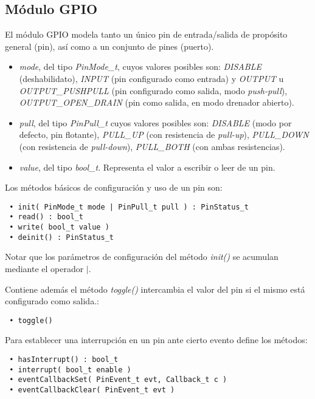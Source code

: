 \subsection{Módulo GPIO}

El módulo GPIO modela tanto un único pin de entrada/salida de propósito general (pin), así como a un conjunto de pines (puerto). 


\begin{itemize}
\item
\emph{mode}, del tipo \emph{PinMode\_t}, cuyos valores posibles son: \emph{DISABLE} (deshabilidato), \emph{INPUT} (pin configurado como entrada) y \emph{OUTPUT} u \emph{OUTPUT\_PUSHPULL} (pin configurado como salida, modo \emph{push-pull}), \emph{OUTPUT\_OPEN\_DRAIN} (pin como salida, en modo drenador abierto).
\item
\emph{pull}, del tipo \emph{PinPull\_t} cuyos valores posibles son: \emph{DISABLE} (modo por defecto, pin flotante), \emph{PULL\_UP} (con resistencia de \emph{pull-up}), \emph{PULL\_DOWN} (con resistencia de \emph{pull-down}), \emph{PULL\_BOTH} (con ambas resistencias).
\item
\emph{value}, del tipo \emph{bool\_t}. Representa el valor a escribir o leer de un pin.
\end{itemize}


Los métodos básicos de configuración y uso de un pin son:

\begin{verbatim}
 • init( PinMode_t mode | PinPull_t pull ) : PinStatus_t
 • read() : bool_t
 • write( bool_t value )
 • deinit() : PinStatus_t
\end{verbatim}

Notar que los parámetros de configuración del método \emph{init()} se acumulan mediante el operador $|$. 

Contiene además el método \emph{toggle()} intercambia el valor del pin si el mismo está configurado como salida.:

\begin{verbatim}
 • toggle()
\end{verbatim}

Para establecer una interrupción en un pin ante cierto evento define los métodos: 

\begin{verbatim}
 • hasInterrupt() : bool_t
 • interrupt( bool_t enable )
 • eventCallbackSet( PinEvent_t evt, Callback_t c )
 • eventCallbackClear( PinEvent_t evt )
\end{verbatim}

